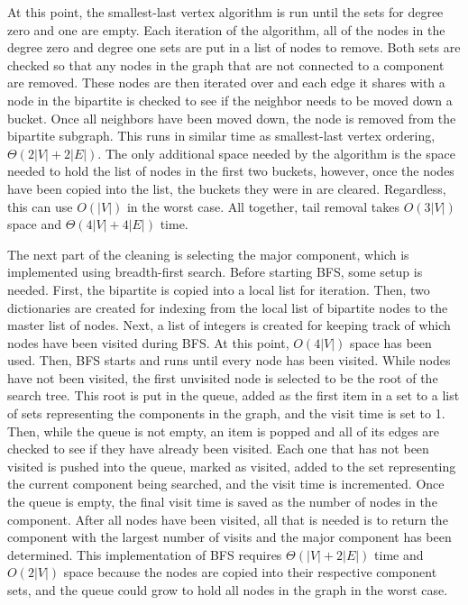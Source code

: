\documentclass{article}
\begin{document}
        At this point, the smallest-last vertex algorithm is run until the sets for degree zero and one are empty. Each iteration of the algorithm, all of the nodes in the degree zero and degree one sets are put in a list of nodes to remove. Both sets are checked so that any nodes in the graph that are not connected to a component are removed. These nodes are then iterated over and each edge it shares with a node in the bipartite is checked to see if the neighbor needs to be moved down a bucket. Once all neighbors have been moved down, the node is removed from the bipartite subgraph. This runs in similar time as smallest-last vertex ordering, $\Theta(2|V| + 2|E|)$. The only additional space needed by the algorithm is the space needed to hold the list of nodes in the first two buckets, however, once the nodes have been copied into the list, the buckets they were in are cleared. Regardless, this can use $O(|V|)$ in the worst case. All together, tail removal takes $O(3|V|)$ space and $\Theta(4|V| + 4|E|)$ time.
        \par
        The next part of the cleaning is selecting the major component, which is implemented using breadth-first search. Before starting BFS, some setup is needed. First, the bipartite is copied into a local list for iteration. Then, two dictionaries are created for indexing from the local list of bipartite nodes to the master list of nodes. Next, a list of integers is created for keeping track of which nodes have been visited during BFS. At this point, $O(4|V|)$ space has been used. Then, BFS starts and runs until every node has been visited. While nodes have not been visited, the first unvisited node is selected to be the root of the search tree. This root is put in the queue, added as the first item in a set to a list of sets representing the components in the graph, and the visit time is set to 1. Then, while the queue is not empty, an item is popped and all of its edges are checked to see if they have already been visited. Each one that has not been visited is pushed into the queue, marked as visited, added to the set representing the current component being searched, and the visit time is incremented. Once the queue is empty, the final visit time is saved as the number of nodes in the component. After all nodes have been visited, all that is needed is to return the component with the largest number of visits and the major component has been determined. This implementation of BFS requires $\Theta(|V| + 2|E|)$ time and $O(2|V|)$ space because the nodes are copied into their respective component sets, and the queue could grow to hold all nodes in the graph in the worst case.
\end{document}
